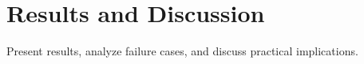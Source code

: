 ﻿\section{Results and Discussion}

Present results, analyze failure cases, and discuss practical implications.
